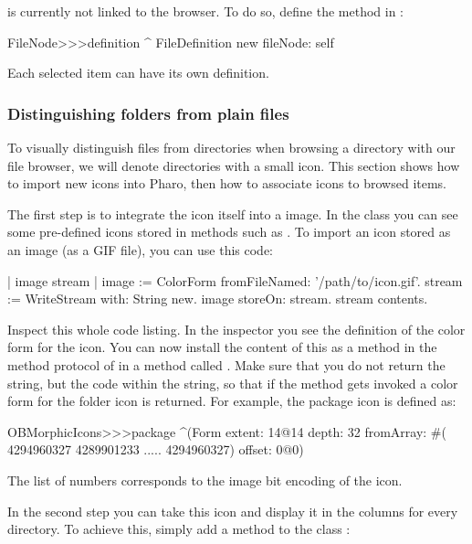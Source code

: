 \documentclass[a4paper,10pt,twoside]{book}
\begin{document}
 is currently not linked to the browser. To do so, define the method  in :

\begin{code}{}
FileNode>>>definition
	^ FileDefinition new fileNode: self
\end{code}

Each selected item can have its own definition. 

\subsubsection{Distinguishing folders from plain files}

To visually distinguish files from directories when browsing a directory with our file browser, we will denote directories with a small icon. This section shows how to import new icons into Pharo, then how to associate icons to browsed items.

The first step is to integrate the icon itself into a \pharo image. In the class  you can see some pre-defined icons stored in methods such as . To import an icon stored as an image (\eg as a GIF file), you can use this code:

\begin{code}{}
| image stream |
image := ColorForm fromFileNamed: '/path/to/icon.gif'.
stream := WriteStream with: String new.
image storeOn: stream.
stream contents.
\end{code}

Inspect this whole code listing. In the inspector you see the definition of the color form for the icon. You can now install the content of this  as a method in the method protocol  of  in a method called . Make sure that you do not return the string, but the code within the string, so that if the method gets invoked a color form for the folder icon is returned. For example, the package icon is defined as:

\begin{code}{}
OBMorphicIcons>>>package
    ^(Form
	extent: 14@14
	depth: 32
	fromArray: #( 4294960327 4289901233 .....  4294960327)
	offset: 0@0)
\end{code}

The list of numbers corresponds to the image bit encoding of the icon.

In the second step you can take this icon and display it in the columns for every directory. To achieve this, simply add a method  to the class :
\end{document}
